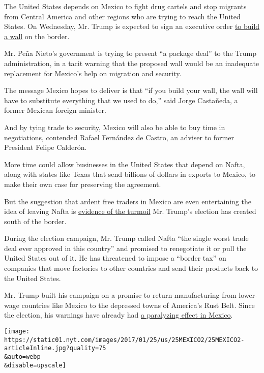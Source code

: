 The United States depends on Mexico to fight drug cartels and stop
migrants from Central America and other regions who are trying to reach
the United States. On Wednesday, Mr. Trump is expected to sign an
executive order
\href{https://www.nytimes.com/2017/01/24/us/politics/wall-border-trump.html?ribbon-ad-idx=3\&rref=homepage\&module=Ribbon\&version=origin\&region=Header\&action=click\&contentCollection=Home\%20Page\&pgtype=article}{to
build a wall} on the border.

Mr. Peña Nieto's government is trying to present ``a package deal'' to
the Trump administration, in a tacit warning that the proposed wall
would be an inadequate replacement for Mexico's help on migration and
security.

The message Mexico hopes to deliver is that ``if you build your wall,
the wall will have to substitute everything that we used to do,'' said
Jorge Castañeda, a former Mexican foreign minister.

And by tying trade to security, Mexico will also be able to buy time in
negotiations, contended Rafael Fernández de Castro, an adviser to former
President Felipe Calderón.

More time could allow businesses in the United States that depend on
Nafta, along with states like Texas that send billions of dollars in
exports to Mexico, to make their own case for preserving the agreement.

But the suggestion that ardent free traders in Mexico are even
entertaining the idea of leaving Nafta is
\href{https://www.nytimes.com/2016/11/10/world/americas/mexico-donald-trump-peso.html}{evidence
of the turmoil} Mr. Trump's election has created south of the border.

During the election campaign, Mr. Trump called Nafta ``the single worst
trade deal ever approved in this country'' and promised to renegotiate
it or pull the United States out of it. He has threatened to impose a
``border tax'' on companies that move factories to other countries and
send their products back to the United States.

Mr. Trump built his campaign on a promise to return manufacturing from
lower-wage countries like Mexico to the depressed towns of America's
Rust Belt. Since the election, his warnings have already had
\href{https://www.nytimes.com/2017/01/05/world/americas/mexico-pena-nieto-trump-turmoil-gasoline.html}{a
paralyzing effect in Mexico}.

\texttt{[image: https://static01.nyt.com/images/2017/01/25/us/25MEXICO2/25MEXICO2-articleInline.jpg?quality=75\\\&auto=webp\\\&disable=upscale]}

